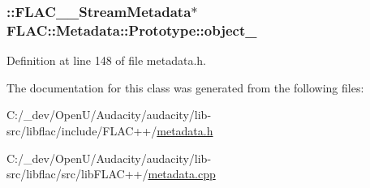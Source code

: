 \subsubsection[{\texorpdfstring{object\+\_\+}{object_}}]{\setlength{\rightskip}{0pt plus 5cm}\+::{\bf F\+L\+A\+C\+\_\+\+\_\+\+Stream\+Metadata}$\ast$ F\+L\+A\+C\+::\+Metadata\+::\+Prototype\+::object\+\_\+\hspace{0.3cm}{\ttfamily [protected]}}\hypertarget{class_f_l_a_c_1_1_metadata_1_1_prototype_ae3bddea1798a712c7d43d393807a9961}{}\label{class_f_l_a_c_1_1_metadata_1_1_prototype_ae3bddea1798a712c7d43d393807a9961}


Definition at line 148 of file metadata.\+h.



The documentation for this class was generated from the following files\+:\begin{DoxyCompactItemize}
\item 
C\+:/\+\_\+dev/\+Open\+U/\+Audacity/audacity/lib-\/src/libflac/include/\+F\+L\+A\+C++/\hyperlink{include_2_f_l_a_c_09_09_2metadata_8h}{metadata.\+h}\item 
C\+:/\+\_\+dev/\+Open\+U/\+Audacity/audacity/lib-\/src/libflac/src/lib\+F\+L\+A\+C++/\hyperlink{lib_f_l_a_c_09_09_2metadata_8cpp}{metadata.\+cpp}\end{DoxyCompactItemize}
